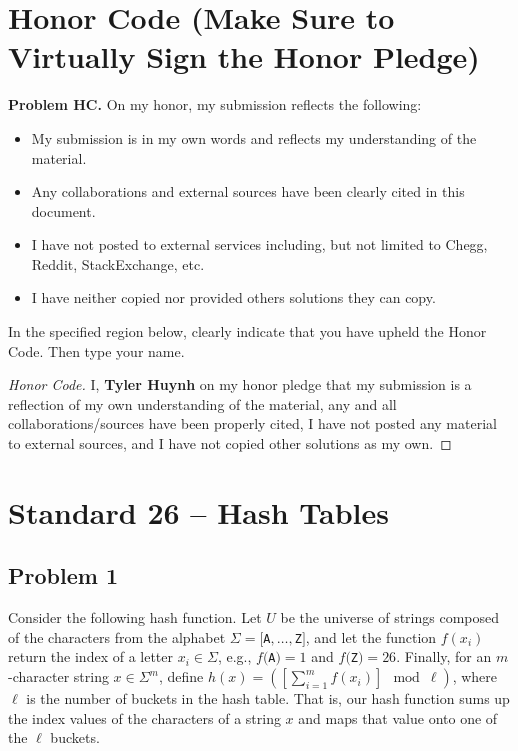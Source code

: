 \documentclass[11pt]{article}
\theoremstyle{definition}
\theoremstyle{definition}
\theoremstyle{definition}
\begin{document}
\section*{Honor Code (Make Sure to Virtually Sign the Honor Pledge)} 
\hypertarget{HonorCode}{}

\textbf{Problem HC.} 
On my honor, my submission reflects the following:
\begin{itemize}
\item My submission is in my own words and reflects my understanding of the material.
\item Any collaborations and external sources have been clearly cited in this document.
\item I have not posted to external services including, but not limited to Chegg, Reddit, StackExchange, etc.
\item I have neither copied nor provided others solutions they can copy.
\end{itemize}

\noindent In the specified region below, clearly indicate that you have upheld the Honor Code. Then type your name. 

\begin{proof}[Honor Code]
I, \textbf{Tyler Huynh} on my honor pledge that my submission is a reflection of my own understanding of the material, any and all collaborations/sources have been properly cited, I have not posted any material to external sources, and I have not copied other solutions as my own.\end{proof}


\newpage
\setcounter{section}{25}
\section{Standard 26 -- Hash Tables}

\subsection{Problem 1}
Consider the following hash function. Let $U$ be the universe of strings composed of the characters from the alphabet $\Sigma=[${\tt A}$,\dots,${\tt Z}$]$, and let the function $f(x_{i})$ return the index of a letter $x_{i}\in \Sigma$, e.g., $f(${\tt A}$)=1$ and $f(${\tt Z}$)=26$. Finally, for an $m$-character string $x\in \Sigma^{m}$, define $h(x) = \left(\left[\sum_{i=1}^{m}f(x_{i})\right]\!\! \mod \ell\right)$, where $\ell$ is the number of buckets in the hash table. That is, our hash function sums up the index values of the characters of a string $x$ and maps that value onto one of the $\ell$ buckets.
\end{document}
